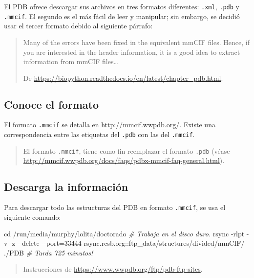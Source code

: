 \documentclass[
]{book}
\newenvironment{Shaded}{\begin{snugshade}}{\end{snugshade}}
\newcommand{\BuiltInTok}[1]{#1}
\newcommand{\CommentTok}[1]{\textcolor[rgb]{0.56,0.35,0.01}{\textit{#1}}}
\newcommand{\FunctionTok}[1]{\textcolor[rgb]{0.00,0.00,0.00}{#1}}
\newcommand{\NormalTok}[1]{#1}
\begin{document}
El PDB ofrece descargar sus archivos en tres formatos diferentes: \texttt{.xml}, \texttt{.pdb} y \texttt{.mmcif}. El segundo es el más fácil de leer y manipular; sin embargo, se decidió usar el tercer formato debido al siguiente párrafo:

\begin{quote}
Many of the errors have been fixed in the equivalent mmCIF files. Hence, if you are interested in the header information, it is a good idea to extract information from mmCIF files\ldots{}

De \url{https://biopython.readthedocs.io/en/latest/chapter_pdb.html}.
\end{quote}

\hypertarget{conoce-el-formato}{%
\subsection{Conoce el formato}\label{conoce-el-formato}}

El formato \texttt{.mmcif} se detalla en \url{http://mmcif.wwpdb.org/}. Existe una correspondencia entre las etiquetas del \texttt{.pdb} con las del \texttt{.mmcif}.

\begin{quote}
El formato \texttt{.mmcif}, tiene como fin reemplazar el formato \texttt{.pdb} (véase \url{http://mmcif.wwpdb.org/docs/faqs/pdbx-mmcif-faq-general.html}).
\end{quote}

\hypertarget{descarga-la-informaciuxf3n}{%
\subsection{Descarga la información}\label{descarga-la-informaciuxf3n}}

Para descargar todo las estructuras del PDB en formato \texttt{.mmcif}, se usa el siguiente comando:

\begin{Shaded}
\begin{Highlighting}[]
\BuiltInTok{cd}\NormalTok{ /run/media/murphy/lolita/doctorado }\CommentTok{\# Trabaja en el disco duro.}
\FunctionTok{rsync}\NormalTok{ {-}rlpt {-}v {-}z {-}{-}delete {-}{-}port=33444 rsync.rcsb.org::ftp\_data/structures/divided/mmCIF/ ./PDB }
\CommentTok{\# Tarda 725 minutos!}
\end{Highlighting}
\end{Shaded}

\begin{quote}
Instrucciones de \url{https://www.wwpdb.org/ftp/pdb-ftp-sites}.
\end{quote}
\end{document}
